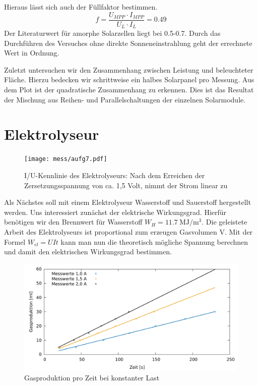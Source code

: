 Hieraus lässt sich auch der Füllfaktor bestimmen.
\[
	f= \frac{U_{MPP} \cdot I_{MPP}}{U_L \cdot I_L} = 0.49
\]
Der Literaturwert für amorphe Solarzellen liegt bei 0.5-0.7. Durch das Durchführen des Versuches ohne direkte Sonneneinstrahlung geht der errechnete Wert in Ordnung.

Zuletzt untersuchen wir den Zusammenhang zwischen Leistung und beleuchteter Fläche. Hierzu bedecken wir schrittweise ein halbes Solarpanel pro Messung. Aus dem Plot  ist der quadratische Zusammenhang zu erkennen. Dies ist das Resultat der Mischung aus Reihen- und Parallelschaltungen der einzelnen Solarmodule. 

\section{Elektrolyseur}

\begin{figure}[htbp]
	\centering
	\texttt{[image: mess/aufg7.pdf]}
	\caption{I/U-Kennlinie des Elektrolyseurs: Nach dem Erreichen der Zersetzungsspannung von ca. 1,5 Volt, nimmt der Strom linear zu}
	\label{a7}
\end{figure}

Als Nächstes soll mit einem Elektrolyseur Wasserstoff und Sauerstoff hergestellt werden. 
Uns interessiert zunächst der elektrische Wirkungsgrad. Hierfür benötigen wir den Brennwert für Wasserstoff $W_H = \SI{11,7}{\mega \joule \per \metre \cubed}$. 
Die geleistete Arbeit des Elektrolyseurs ist proportional zum erzeugen Gasvolumen V. Mit der Formel $W_{el}=UIt$ kann man nun die theoretisch mögliche Spannung berechnen und damit den elektrischen Wirkungsgrad bestimmen.
\begin{figure}[htbp]
	\centering
	\includegraphics[width=1\textwidth]{mess/aufg8.pdf}
	\caption{Gasproduktion pro Zeit bei konstanter Last}
	\label{a8}
\end{figure}


